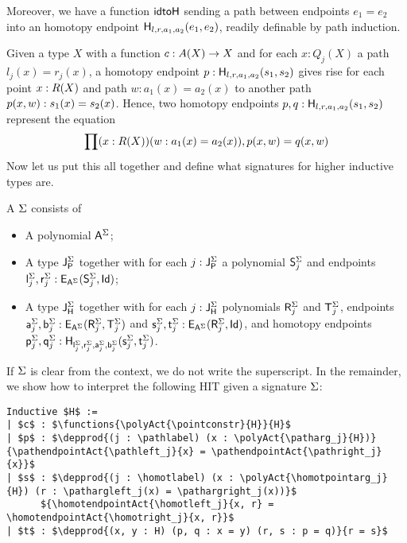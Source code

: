 \vspace{5pt}
Moreover, we have a function $\idtoH$ sending a path between endpoints $e_1 = e_2$ into an homotopy endpoint $\homotendpoint{l}{r}{a_1}{a_2}{e_1}{e_2}$, readily definable by path induction.

Given a type $X$ with a function $c : \polyAct{A}{X} \rightarrow X$ and for each $x : Q_j(X)$ a path $l_j(x) = r_j(x)$,
a homotopy endpoint $p : \homotendpoint{l}{r}{a_1}{a_2}{s_1}{s_2}$ gives rise for each point $x : \polyAct{R}{X}$ and path $w : a_1(x) = a_2(x)$
to another path $\homotendpointAct{p}{x, w} : s_1(x) = s_2(x)$.
Hence, two homotopy endpoints $p, q : \homotendpoint{l}{r}{a_1}{a_2}{s_1}{s_2}$ represent the equation
\[
\depprod{(x : \polyAct{R}{X}) (w : a_1(x) = a_2(x))}{\homotendpointAct{p}{x, w} = \homotendpointAct{q}{x, w}}
\]
Now let us put this all together and define what signatures for higher inductive types are.

\begin{definition}
\label{def:signature}
A  $\sign$ consists of
\begin{itemize}
	\item A polynomial $\pointconstr[\sign]$;
	\item A type $\pathlabel[\sign]$ together with for each $j : \pathlabel[\sign]$ a polynomial $\patharg[\sign]_j$ and endpoints $\pathleft[\sign]_j, \pathright[\sign]_j : \pathendpoint{\pointconstr[\sign]}{\patharg[\sign]_j}{\idP}$;
	\item A type $\homotlabel[\sign]$ together with for each $j : \homotlabel[\sign]$ polynomials $\homotpointarg[\sign]_j$ and $\homotpathtarg[\sign]_j$,
	endpoints $\pathargleft[\sign]_j, \pathargright[\sign]_j : \pathendpoint{\pointconstr[\sign]}{\homotpointarg[\sign]_j}{\homotpathtarg[\sign]_j}$
	and $\homotpathleft[\sign]_j, \homotpathright[\sign]_j : \pathendpoint{\pointconstr[\sign]}{\homotpointarg[\sign]_j}{\idP}$,
	and homotopy endpoints $\homotleft[\sign]_j, \homotright[\sign]_j : \homotendpoint{\pathleft[\sign]_j}{\pathright[\sign]_j}{\pathargleft[\sign]_j}{\pathargright[\sign]_j}{\homotpathleft[\sign]_j}{\homotpathright[\sign]_j}$.
\end{itemize}
\end{definition}

If $\sign$ is clear from the context, we do not write the superscript.
In the remainder, we show how to interpret the following HIT given a signature $\sign$:

\begin{lstlisting}[mathescape=true]
Inductive $H$ :=
| $c$ : $\functions{\polyAct{\pointconstr}{H}}{H}$
| $p$ : $\depprod{(j : \pathlabel) (x : \polyAct{\patharg_j}{H})}{\pathendpointAct{\pathleft_j}{x} = \pathendpointAct{\pathright_j}{x}}$
| $s$ : $\depprod{(j : \homotlabel) (x : \polyAct{\homotpointarg_j}{H}) (r : \pathargleft_j(x) = \pathargright_j(x))}$
      ${\homotendpointAct{\homotleft_j}{x, r} = \homotendpointAct{\homotright_j}{x, r}}$
| $t$ : $\depprod{(x, y : H) (p, q : x = y) (r, s : p = q)}{r = s}$
\end{lstlisting}

